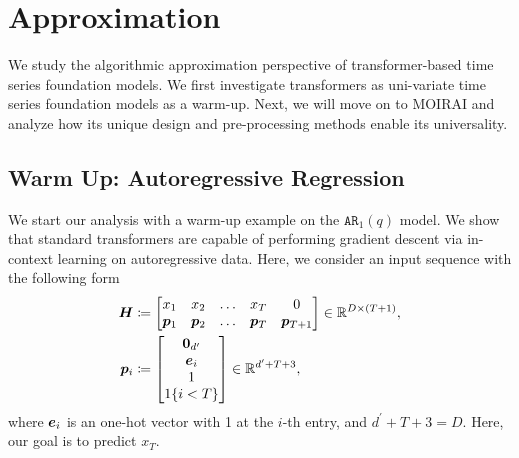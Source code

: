 \section{Approximation}
We study the algorithmic approximation perspective of transformer-based time series foundation models.
We first investigate transformers as uni-variate time series foundation models as a warm-up.
Next, we will move on to MOIRAI \cite{woo2024unified} and analyze how its unique design and pre-processing methods enable its universality.
\subsection{Warm Up: Autoregressive Regression}
We start our analysis with a warm-up example on the $\mathtt{AR}_1(q)$ model.
We show that standard transformers are capable of performing gradient descent via in-context learning on autoregressive data.
Here, we consider an input sequence with the following form
\begin{align}\label{eqn:input-data}
    \boldsymbol{H} 
    &\coloneqq
    \begin{bmatrix}
        x_1 & x_2 &  \dots & x_{T} & 0
        \\
        \bm{p}_1 & \bm{p}_2 & \dots & \bm{p}_{T} &
        \bm{p}_{T+1}
    \end{bmatrix}
    \in \mathbb{R}^{D \times (T+1)}
    ,
    \\
    \bm{p}_i
    &\coloneqq
    \begin{bmatrix}
        \mathbf{0}_{d^\prime}
        \\
        \bm{e}_i
        \\
        1
        \\
        1\{ i < {T} \}
    \end{bmatrix}
    \in \mathbb{R}^{d^\prime + T + 3}
    ,
\end{align}
where $\bm{e}_i$ is an one-hot vector with 1 at the $i$-th entry, and $d^\prime + T + 3 = D$.
Here, our goal is to predict $x_{T}$.
